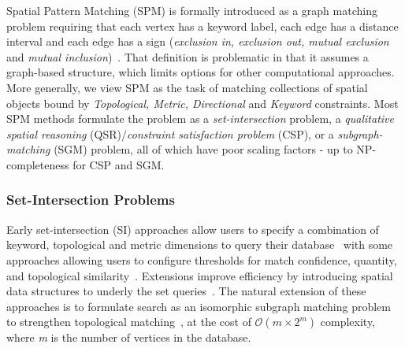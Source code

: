 \par{
    Spatial Pattern Matching (SPM) is formally introduced as a graph matching problem requiring that each vertex has a keyword label, each edge has a distance interval and each edge has a sign (\textit{exclusion in, exclusion out, mutual exclusion} and \textit{mutual inclusion})~\cite{Fang2019}.
    That definition is problematic in that it assumes a graph-based structure, which limits options for other computational approaches.
    More generally, we view SPM as the task of matching collections of spatial objects bound by \textit{Topological, Metric, Directional} and \textit{Keyword} constraints.
    Most SPM methods formulate the problem as a \textit{set-intersection} problem, a \textit{qualitative spatial reasoning} (QSR)/\textit{constraint satisfaction problem} (CSP), or a \textit{subgraph-matching} (SGM) problem, all of which have poor scaling factors - up to NP-completeness for CSP and SGM. 
    }
\subsubsection{Set-Intersection Problems}
\par{  
    Early set-intersection (SI) approaches allow users to specify a combination of keyword, topological and metric dimensions to query their database~\cite{DiLoreto1996} with some approaches allowing users to configure thresholds for match confidence, quantity, and topological similarity~\cite{Soffer1997, Soffer1998a}. 
    Extensions improve efficiency by introducing spatial data structures to underly the set queries~\cite{Soffer1999}.
    The natural extension of these approaches is to formulate search as an isomorphic subgraph matching problem to strengthen topological matching~\cite{Folkers2000}, at the cost of $\mathcal{O}(m\times 2^m)$ complexity, where \textit{m} is the number of vertices in the database. 
}
